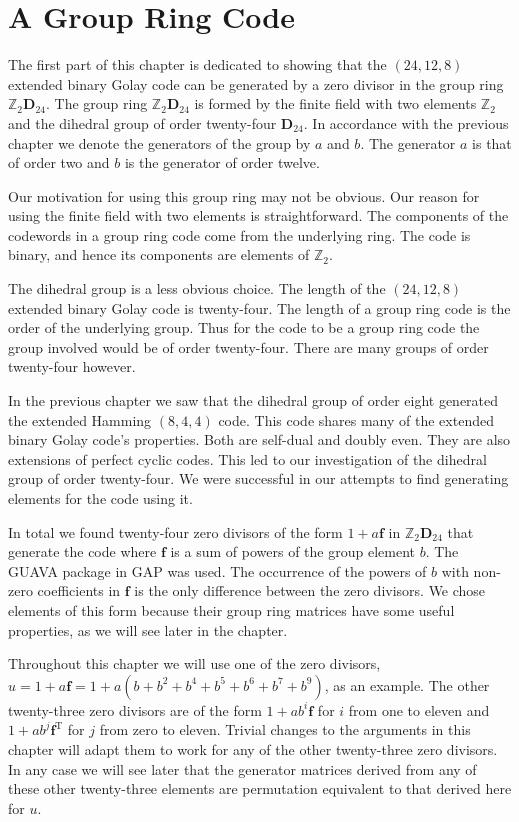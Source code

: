 \section{A Group Ring Code}
\label{sect:listgolayzds}
The first part of this chapter is dedicated to showing that the $(24,12,8)$ extended binary Golay code can be generated by a zero divisor in the group ring $\mathbb{Z}_2 \mathbf{D}_{24}$.
The group ring $\mathbb{Z}_2 \mathbf{D}_{24}$ is formed by the finite field with two elements $\mathbb{Z}_2$ and the dihedral group of order twenty-four $\mathbf{D}_{24}$.
In accordance with the previous chapter we denote the generators of the group by $a$ and $b$.
The generator $a$ is that of order two and $b$ is the generator of order twelve.

Our motivation for using this group ring may not be obvious.
Our reason for using the finite field with two elements is straightforward.
The components of the codewords in a group ring code come from the underlying ring.
The code is binary, and hence its components are elements of $\mathbb{Z}_2$.

The dihedral group is a less obvious choice.
The length of the $(24,12,8)$ extended binary Golay code is twenty-four.
The length of a group ring code is the order of the underlying group.
Thus for the code to be a group ring code the group involved would be of order twenty-four.
There are many groups of order twenty-four however.

In the previous chapter we saw that the dihedral group of order eight generated the extended Hamming $(8,4,4)$ code.
This code shares many of the extended binary Golay code's properties.
Both are self-dual and doubly even.
They are also extensions of perfect cyclic codes.
This led to our investigation of the dihedral group of order twenty-four.
We were successful in our attempts to find generating elements for the code using it.

In total we found twenty-four zero divisors of the form $1+a\mathbf{f}$ in $\mathbb{Z}_2 \mathbf{D}_{24}$ that generate the code where $\mathbf{f}$ is a sum of powers of the group element $b$.
The GUAVA package in GAP was used\cite{gap06}. 
The occurrence of the powers of $b$ with non-zero coefficients in $\mathbf{f}$ is the only difference between the zero divisors.
We chose elements of this form because their group ring matrices have some useful properties, as we will see later in the chapter.

Throughout this chapter we will use one of the zero divisors, $u = 1+a\mathbf{f} = 1 + a(b + b^2 + b^4 + b^5 + b^6 + b^7 + b^9)$, as an example.
The other twenty-three zero divisors are of the form $1+ab^i\mathbf{f}$ for $i$ from one to eleven and $1+ab^j\mathbf{f}^{\textrm{T}}$ for $j$ from zero to eleven.
Trivial changes to the arguments in this chapter will adapt them to work for any of the other twenty-three zero divisors.
In any case we will see later that the generator matrices derived from any of these other twenty-three elements are permutation equivalent to that derived here for $u$.

